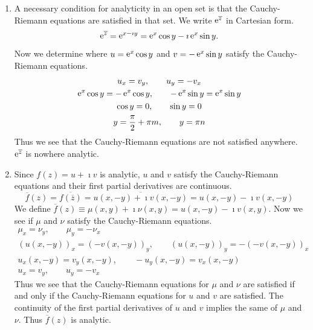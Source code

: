 {%
\begin{Solution}
  \label{solution ol f(z)}
  \begin{enumerate}
  \item
    A necessary condition for analyticity in an open set is that the 
    Cauchy-Riemann equations are satisfied in that set.  
    We write $\mathop{\mathrm{e}}\nolimits^{\overline{z}}$ in Cartesian form.
    \[
    \mathop{\mathrm{e}}\nolimits^{\overline{z}} = \mathop{\mathrm{e}}\nolimits^{x - \imath y} = \mathop{\mathrm{e}}\nolimits^x \cos y - \imath  \mathop{\mathrm{e}}\nolimits^x \sin y.
    \]
    Now we determine where $u = \mathop{\mathrm{e}}\nolimits^x \cos y$ and $v = - \mathop{\mathrm{e}}\nolimits^x \sin y$ satisfy the
    Cauchy-Riemann equations.
    \begin{gather*}
      u_x = v_y,
      \qquad
      u_y = - v_x 
      \\
      \mathop{\mathrm{e}}\nolimits^x \cos y = - \mathop{\mathrm{e}}\nolimits^x \cos y,
      \qquad
      - \mathop{\mathrm{e}}\nolimits^x \sin y = \mathop{\mathrm{e}}\nolimits^x \sin y 
      \\
      \cos y = 0,
      \qquad
      \sin y = 0 \\
      y = \frac{\pi}{2} + \pi m,
      \qquad
      y = \pi n
    \end{gather*}
    Thus we see that the Cauchy-Riemann equations are not satisfied anywhere.
    $\mathop{\mathrm{e}}\nolimits^{\overline{z}}$ is nowhere analytic.
  \item
    Since $f(z) = u + \imath v$ is analytic, $u$ and $v$ satisfy the 
    Cauchy-Riemann equations and their first partial derivatives 
    are continuous.
    \[
    \overline{f}(z) = \overline{f\left( \overline{z} \right)} 
    = \overline{u(x, -y) + \imath v(x, -y)}
    = u(x, -y) - \imath v(x, -y)
    \]
    We define $\overline{f}(z) \equiv \mu(x, y) + \imath \nu(x, y) = u(x, -y) - \imath v(x, y)$.
    Now we see if $\mu$ and $\nu$ satisfy the Cauchy-Riemann equations.
    \begin{gather*}
      \mu_x = \nu_y, \qquad \mu_y = - \nu_x 
      \\
      (u(x, -y))_x = (-v(x, -y))_y, \qquad 
      (u(x, -y))_y = - (-v(x, -y))_x 
      \\
      u_x(x, -y) = v_y(x, -y), \qquad
      - u_y(x, -y) = v_x(x, -y) 
      \\
      u_x = v_y, \qquad u_y = - v_x 
    \end{gather*}
    Thus we see that the Cauchy-Riemann equations for $\mu$ and $\nu$ are
    satisfied if and only if the Cauchy-Riemann equations for $u$ and $v$
    are satisfied.  The continuity of the first partial derivatives of 
    $u$ and $v$ implies the same of $\mu$ and $\nu$.  Thus 
    $\overline{f}(z)$ is analytic.
  \end{enumerate}
\end{Solution}







}
